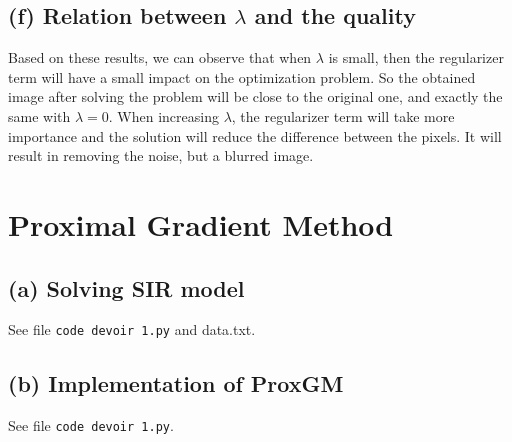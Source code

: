 \documentclass{article}
\begin{document}
\subsection*{(f) Relation between $\lambda$ and the quality}
Based on these results, we can observe that when $\lambda$ is small, then the
regularizer term will have a small impact on the optimization problem. So the
obtained image after solving the problem will be close to the original one, and
exactly the same with $\lambda = 0$. When increasing $\lambda$, the regularizer term
will take more importance and the solution will reduce the difference between the pixels.
It will result in removing the noise, but a blurred image. 


\section*{Proximal Gradient Method}
\subsection*{(a) Solving SIR model}
See file \texttt{code devoir 1.py} and data.txt. 

\subsection*{(b) Implementation of ProxGM}
See file \texttt{code devoir 1.py}.
\end{document}
